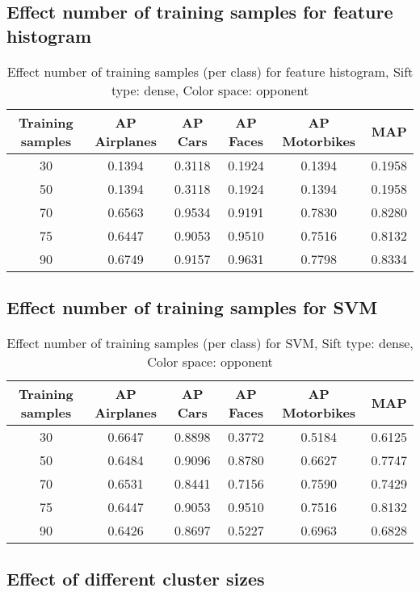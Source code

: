 \subsection{Effect number of training samples for feature histogram}

\begin{table}[H]
\begin{tabular}{|c|ccccc|}
\hline
\textbf{Training samples} & \textbf{AP Airplanes} & \textbf{AP Cars} & \textbf{AP Faces} & \textbf{AP Motorbikes} & \textbf{MAP}\\
\hline
30 & 0.1394 & 0.3118& 0.1924& 0.1394 & 0.1958\\
50 & 0.1394 & 0.3118& 0.1924& 0.1394 & 0.1958\\
70 & 0.6563 & 0.9534 & 0.9191 & 0.7830 & 0.8280\\
75 & 0.6447 & 0.9053 & 0.9510 & 0.7516 & 0.8132\\
90 & 0.6749 & 0.9157 & 0.9631 & 0.7798 & 0.8334\\
\hline
\end{tabular}
\caption{Effect number of training samples (per class) for feature histogram, Sift type: dense, Color space: opponent}
\end{table}


\subsection{Effect number of training samples for SVM}

\begin{table}[H]
\begin{tabular}{|c|ccccc|}
\hline
\textbf{Training samples} & \textbf{AP Airplanes} & \textbf{AP Cars} & \textbf{AP Faces} & \textbf{AP Motorbikes} & \textbf{MAP}\\
\hline
30 & 0.6647 & 0.8898 & 0.3772 & 0.5184& 0.6125\\
50 & 0.6484 & 0.9096 & 0.8780 & 0.6627 & 0.7747\\
70 & 0.6531 & 0.8441 & 0.7156 & 0.7590 & 0.7429\\
75 & 0.6447 & 0.9053 & 0.9510 & 0.7516 & 0.8132\\
90 & 0.6426 & 0.8697 & 0.5227 & 0.6963 & 0.6828\\
\hline
\end{tabular}
\caption{Effect number of training samples (per class) for SVM, Sift type: dense, Color space: opponent}
\end{table}


\subsection{Effect of different cluster sizes}

